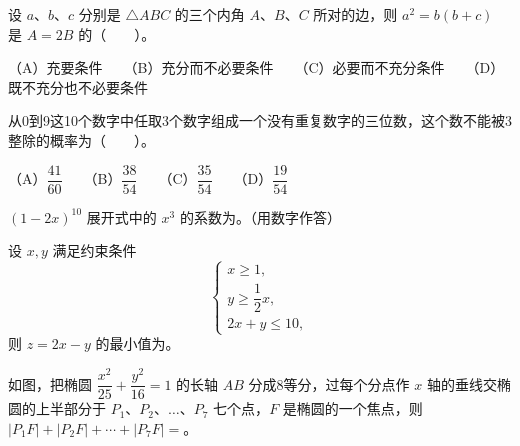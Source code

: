 \begin{question}
设 $a\text{、}b\text{、}c$ 分别是 $\triangle ABC$ 的三个内角 $A\text{、}B\text{、}C$ 所对的边，则 $a^2=b(b+c)$ 是 $A=2B$ 的\mbox{（　　）}。

（A）充要条件　　（B）充分而不必要条件　　（C）必要而不充分条件　　（D）既不充分也不必要条件

\end{question}
\begin{question}
从0到9这10个数字中任取3个数字组成一个没有重复数字的三位数，这个数不能被3整除的概率为\mbox{（　　）}。

（A）$\dfrac{41}{60}$　　（B）$\dfrac{38}{54}$　　（C）$\dfrac{35}{54}$　　（D）$\dfrac{19}{54}$

\end{question}

\begin{question}
$(1-2x)^{10}$ 展开式中的 $x^3$ 的系数为\gkblank{}。（用数字作答）

\end{question}
\begin{question}
设 $x,y$ 满足约束条件
\nopagebreak[4]
\[
\begin{cases}
x\geqslant1,\\
y\geqslant\dfrac12x,\\
2x+y\leqslant10,
\end{cases}
\]
则 $z=2x-y$ 的最小值为\gkblank{}。

\Needspace{0.4\textheight}
\end{question}
\begin{question}
如图，把椭圆 $\dfrac{x^2}{25}+\dfrac{y^2}{16}=1$ 的长轴 $AB$ 分成8等分，过每个分点作 $x$ 轴的垂线交椭圆的上半部分于 $P_1\text{、}P_2\text{、}\ldots\text{、}P_7$ 七个点，$F$ 是椭圆的一个焦点，则 $|P_1F|+|P_2F|+\cdots+|P_7F|=$\gkblank{}。
\nopagebreak[4]
\begin{center}\end{center}
\nopagebreak[4]
\end{question}

